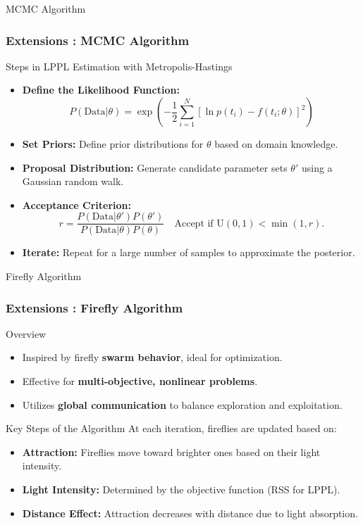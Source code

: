 \documentclass{beamer}
\begin{document}
\begin{frame}{MCMC Algorithm}
    \frametitle{Extensions : MCMC Algorithm}
    \begin{block}{Steps in LPPL Estimation with Metropolis-Hastings}
        \begin{itemize}
            \item \textbf{Define the Likelihood Function:}
                  \[
                  P(\text{Data} | \theta) = \exp\left(-\frac{1}{2} \sum_{i=1}^N \left[\ln p(t_i) - f(t_i; \theta)\right]^2\right)
                  \]
            \item \textbf{Set Priors:} Define prior distributions for \(\theta\) based on domain knowledge.
            \item \textbf{Proposal Distribution:} Generate candidate parameter sets \(\theta'\) using a Gaussian random walk.
            \item \textbf{Acceptance Criterion:}
                  \[
                  r = \frac{P(\text{Data} | \theta') P(\theta')}{P(\text{Data} | \theta) P(\theta)} \quad \text{Accept if } \text{U}(0, 1) < \min(1, r).
                  \]
            \item \textbf{Iterate:} Repeat for a large number of samples to approximate the posterior.
        \end{itemize}
    \end{block}
\end{frame}

\begin{frame}{Firefly Algorithm}
\frametitle{Extensions : Firefly Algorithm}
    \begin{block}{Overview}
        \begin{itemize}
            \item Inspired by firefly \textbf{swarm behavior}, ideal for optimization.
            \item Effective for \textbf{multi-objective, nonlinear problems}.
            \item Utilizes \textbf{global communication} to balance exploration and exploitation.
        \end{itemize}
    \end{block}
    \begin{block}{Key Steps of the Algorithm}
        At each iteration, fireflies are updated based on:
        \begin{itemize}
            \item \textbf{Attraction:} Fireflies move toward brighter ones based on their light intensity.
            \item \textbf{Light Intensity:} Determined by the objective function (RSS for LPPL).
            \item \textbf{Distance Effect:} Attraction decreases with distance due to light absorption.
        \end{itemize}
    \end{block}
\end{frame}
\end{document}
